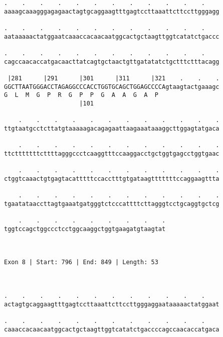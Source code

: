 \documentclass{article}
\begin{document}
\begin{Verbatim}
.    .    .    .    .    .    .    .    .    .    .    .    
aaaagcaaagggagagaactagtgcaggaagtttgagtccttaaattcttccttgggagg
                                                            
.    .    .    .    .    .    .    .    .    .    .    .    
aataaaaactatggaatcaaaccacaacaatggcactgctaagttggtcatatctgaccc
                                                            
.    .    .    .    .    .    .    .    .    .    .    .    
cagccaacaccatgacaacttatcagtgctaactgttgatatatctgctttctttacagg
                                                            
 |281      |291      |301      |311      |321    .    .    .
GGCTTAATGGGACCTAGAGGCCCACCTGGTGCAGCTGGAGCCCCAgtaagtactgaaagc
G  L  M  G  P  R  G  P  P  G  A  A  G  A  P                 
                     |101                                   
  
    .    .    .    .    .    .    .    .    .    .    .    .
ttgtaatgcctcttatgtaaaaagacagagaattaagaaataaaggcttggagtatgaca
                                                            
    .    .    .    .    .    .    .    .    .    .    .    .
ttctttttttcttttagggccctcaaggtttccaaggacctgctggtgagcctggtgaac
                                                            
    .    .    .    .    .    .    .    .    .    .    .    .
ctggtcaaactgtgagtacatttttccacctttgtgataagtttttttccaggaagttta
                                                            
    .    .    .    .    .    .    .    .    .    .    .    .
tgaatataaccttagtgaaatgatgggtctcccattttcttagggtcctgcaggtgctcg
                                                            
    .    .    .    .    .    .    .    .    .
tggtccagctggccctcctggcaaggctggtgaagatgtaagtat
                                             
                                             
 
Exon 8 | Start: 796 | End: 849 | Length: 53



.    .    .    .    .    .    .    .    .    .    .    .    
actagtgcaggaagtttgagtccttaaattcttccttgggaggaataaaaactatggaat
                                                            
.    .    .    .    .    .    .    .    .    .    .    .    
caaaccacaacaatggcactgctaagttggtcatatctgaccccagccaacaccatgaca
                                                            

\end{Verbatim}
\end{document}
